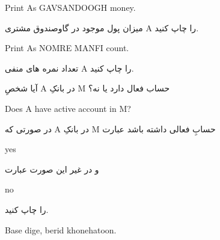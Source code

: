 \documentclass[]{article}
\begin{document}
\hrulefill


\begin{tcolorbox}[boxrule=0pt]
	\begin{latin}
  	  \large{
  	  	Print A\textquotesingle s GAVSANDOOGH money.
		}
	\end{latin}
\end{tcolorbox}


میزان پول موجود در گاوصندوق مشتری A را چاپ کنید.


\hrulefill


\begin{tcolorbox}[boxrule=0pt]
	\begin{latin}
  	  \large{
  	  	Print A\textquotesingle s NOMRE MANFI count.
		}
	\end{latin}
\end{tcolorbox}


تعداد نمره های منفی A را چاپ کنید.


\hrulefill

آیا شخصِ A در بانکِ M حساب فعال دارد یا نه؟

\begin{tcolorbox}[boxrule=0pt]
	\begin{latin}
  	  \large{
  	  	Does A have active account in M?
		}
	\end{latin}
\end{tcolorbox}

در صورتی که A در بانکِ M حسابِ فعالی داشته باشد عبارت

\begin{tcolorbox}[boxrule=0pt]
	\begin{latin}
  	  \large{
  	  	yes
		}
	\end{latin}
\end{tcolorbox}

و در غیر این صورت عبارت

\begin{tcolorbox}[boxrule=0pt]
	\begin{latin}
  	  \large{
  	  	no
		}
	\end{latin}
\end{tcolorbox}

را چاپ کنید.

\hrulefill



\begin{tcolorbox}[boxrule=0pt]
	\begin{latin}
  	  \large{
  	  	Base dige, berid khonehatoon.
		}
	\end{latin}
\end{tcolorbox}
\end{document}
